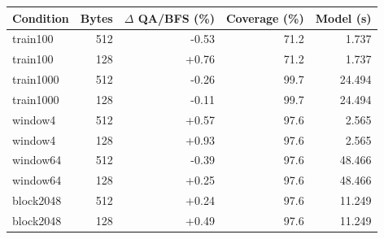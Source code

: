 \begin{tabular}{lrrrr}
\toprule
Condition & Bytes & $\Delta$ QA/BFS (\%) & Coverage (\%) & Model (s) \\
\midrule
train100 & 512 & -0.53 & 71.2 & 1.737 \\
train100 & 128 & +0.76 & 71.2 & 1.737 \\
train1000 & 512 & -0.26 & 99.7 & 24.494 \\
train1000 & 128 & -0.11 & 99.7 & 24.494 \\
window4 & 512 & +0.57 & 97.6 & 2.565 \\
window4 & 128 & +0.93 & 97.6 & 2.565 \\
window64 & 512 & -0.39 & 97.6 & 48.466 \\
window64 & 128 & +0.25 & 97.6 & 48.466 \\
block2048 & 512 & +0.24 & 97.6 & 11.249 \\
block2048 & 128 & +0.49 & 97.6 & 11.249 \\
\bottomrule
\end{tabular}
